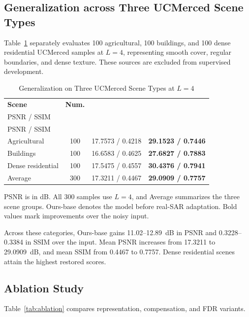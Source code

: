 \documentclass[journal]{IEEEtran}
\begin{document}
\subsection{Generalization across Three UCMerced Scene Types}
Table~\ref{tab:ucm_scenes} separately evaluates 100 agricultural, 100 buildings, and 100 dense residential UCMerced samples at \(L=4\), representing smooth cover, regular boundaries, and dense texture. These sources are excluded from supervised development.

\begin{table}[!t]
\caption{Generalization on Three UCMerced Scene Types at \(L=4\)}
\label{tab:ucm_scenes}
\centering
\footnotesize
\setlength{\tabcolsep}{3.0pt}
\renewcommand{\arraystretch}{1.08}
\begin{tabular*}{\columnwidth}{@{\extracolsep{\fill}}lccc@{}}
\toprule
\textbf{Scene} & \textbf{Num.} &
\shortstack{\textbf{Noisy}\\PSNR / SSIM} &
\shortstack{\textbf{Ours-base}\\PSNR / SSIM} \\
\midrule
Agricultural & 100 & 17.7573 / 0.4218 & \textbf{29.1523 / 0.7446} \\
Buildings    & 100 & 16.6583 / 0.4625 & \textbf{27.6827 / 0.7883} \\
Dense residential & 100 & 17.5475 / 0.4557 & \textbf{30.4376 / 0.7941} \\
\midrule
Average      & 300 & 17.3211 / 0.4467 & \textbf{29.0909 / 0.7757} \\
\bottomrule
\end{tabular*}
\vspace{1pt}
\parbox{\columnwidth}{\footnotesize PSNR is in dB. All 300 samples use \(L=4\), and Average summarizes the three scene groups. Ours-base denotes the model before real-SAR adaptation. Bold values mark improvements over the noisy input.}
\end{table}

Across these categories, Ours-base gains 11.02--12.89~dB in PSNR and 0.3228--0.3384 in SSIM over the input. Mean PSNR increases from 17.3211 to 29.0909~dB, and mean SSIM from 0.4467 to 0.7757. Dense residential scenes attain the highest restored scores.

\subsection{Ablation Study}
Table~\ref{tab:ablation} compares representation, compensation, and FDR variants.
\end{document}
